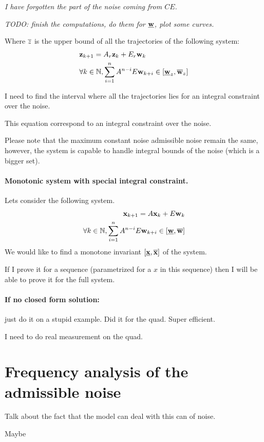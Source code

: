 \documentclass{article}
\begin{document}
\textit{I have forgotten the part of the noise coming from $CE$.}

\textit{TODO: finish the computations, do them for $\underline{\mathbf{w}}$, plot some curves.}

Where $\overline{z}$ is the upper bound of all the trajectories of the following system:
\newcommand{\z}{\vect{z}}%
\newcommand{\zk}{\z_k}%
\newcommand{\zkn}{\z_{k+1}}%
\begin{align*}
&\zkn = A_r \zk + E_r \wk \\
&\forall k \in \mathbb{N}, \sum_{i=1}^n A^{n-i} E \w_{k+i} \in [\minf{\w}_z,\msup{\w}_z]
\end{align*}

I need to find the interval where all the trajectories lies for an integral constraint over the noise.

This equation correspond to an integral constraint over the noise.

Please note that the maximum constant noise admissible noise remain the same, however, the system is capable to handle integral bounds of the noise (which is a bigger set).

\paragraph{Monotonic system with special integral constraint.}
Lets consider the following system.
\begin{align*}
\mathbf{x}_{k+1} = A \mathbf{x}_k + E \mathbf{w}_k \\
\forall k \in \mathbb{N}, \sum_{i=1}^n A^{n-i} E \mathbf{w}_{k+i} \in [\underline{\mathbf{w}},\overline{\mathbf{w}}]
\end{align*}
\newcommand{\mxint}{[\minf{\x},\msup{\x}]}
We would like to find a monotone invariant $\mxint$ of the system.

If I prove it for a sequence (parametrized for a $x$ in this sequence) then I will be able to prove it for the full system.

\paragraph{If no closed form solution:} just do it on a stupid example. Did it for the quad.
Super efficient.

I need to do real measurement on the quad.

\section{Frequency analysis of the admissible noise}
Talk about the fact that the model can deal with this can of noise.

Maybe
\end{document}
